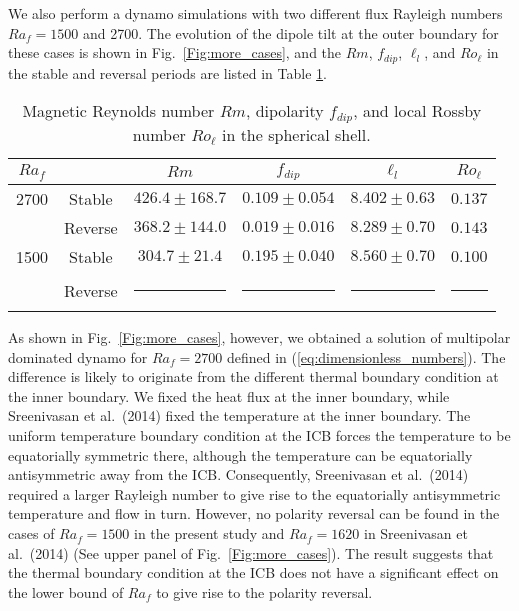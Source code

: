 {\color{red} We also perform a dynamo simulations with two different flux Rayleigh numbers $Ra_{f} = 1500$ and 2700. The evolution of the dipole tilt at the outer boundary for these cases is shown in Fig.~\ref{Fig:more_cases}, and the $Rm$, $f_{dip}$, $\ell_{l}$, and $Ro_{\ell}$ in the stable and reversal periods are listed in Table \ref{table:average_dipolarity_2}.
}
%
\begin{table}[h]
\caption{Magnetic Reynolds number $Rm$, dipolarity $f_{dip}$, and local Rossby number $Ro_{\ell}$ in the spherical shell.}
\label{table:average_dipolarity_2}
\renewcommand{\arraystretch}{1.3} %
\begin{tabular}{cc|cccc}
$Ra_f$ & & $Rm$ & $f_{dip}$ & 
  ${\ell}_{l}$ & $Ro_{\ell}$ \\ \hline
2700 & \mbox{Stable} & $426.4 \pm 168.7 $ &
                $0.109 \pm 0.054$ &
                $8.402 \pm 0.63$ & 
                $0.137$ \\
& \mbox{Reverse} & $368.2 \pm 144.0 $ &
                 $0.019 \pm 0.016$ &
                 $8.289 \pm 0.70$ & 
                 $0.143$\\ \hline
1500 & \mbox{Stable} & $304.7 \pm 21.4 $ &
                $0.195 \pm 0.040$ &
                $8.560 \pm 0.70$ & 
                $0.100$ \\
& \mbox{Reverse} &  \rule[0.5ex]{2em}{0.4pt} &
                  \rule[0.5ex]{2em}{0.4pt} &
                  \rule[0.5ex]{2em}{0.4pt} & 
                  \rule[0.5ex]{2em}{0.4pt} \\ \hline\end{tabular}
\end{table}
%
As shown in Fig.~\ref{Fig:more_cases}, however, we obtained a solution of multipolar dominated dynamo for $Ra_f = 2700$
{\color{teal}
defined in (\ref{eq:dimensionless_numbers}).
}
The difference is likely to originate from the different thermal boundary condition at the inner boundary. 
We fixed the heat flux at the inner boundary, while Sreenivasan et al.\ (2014) fixed the temperature at the inner boundary. 
{\color{teal}
The uniform temperature boundary condition at the ICB forces the temperature to be equatorially symmetric there, although the temperature can be equatorially antisymmetric away from the ICB.
}
Consequently, Sreenivasan et al.\ (2014) required a larger Rayleigh number to give rise to the equatorially antisymmetric temperature and flow in turn. 
However, no polarity reversal can be found in the cases of $Ra_f = 1500$ in the present study and $Ra_f = 1620$ in Sreenivasan et al.\ (2014) (See {\color{magenta}upper} panel of Fig.~\ref{Fig:more_cases}). 
The result suggests that the thermal boundary condition at the ICB does not have a significant effect on the lower bound of $Ra_f$ to give rise to the polarity reversal.

